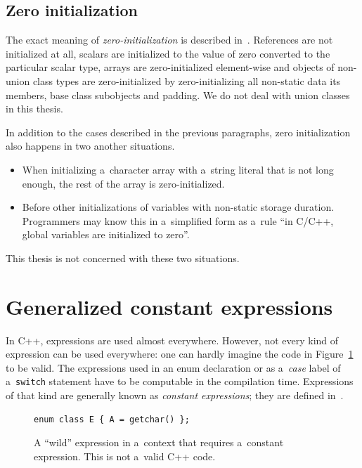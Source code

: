 \documentclass[nolot,nolof,nocover,printed]{fithesis3}
\newcommand{\stdN}[2]{\cite[#2]{#1}\xspace}
\begin{document}
\subsection{Zero initialization}
The exact meaning of \textit{zero-initialization} is described in~\stdN{n4296}{\S 8.5/6}. References are not initialized at all, scalars are initialized to the value of zero converted to the particular scalar type, arrays are zero-initialized element-wise and objects of non-union class types are zero-initialized by zero-initializing all non-static data its members, base class subobjects and padding. We do not deal with union classes in this thesis.

In addition to the cases described in the previous paragraphs, zero initialization also happens in two another situations.
\begin{itemize}
\item When initializing a~character array with a~string literal that is not long enough, the rest of the array is zero-initialized.
\item Before other initializations of variables with non-static storage duration. Programmers may know this in a~simplified form as a~rule \enquote{in C/C++, global variables are initialized to zero}.
\end{itemize}
This thesis is not concerned with these two situations.

\section{Generalized constant expressions}

In C++, expressions are used almost everywhere. However, not every kind of expression can be used everywhere: one can hardly imagine the code in Figure~\ref{fig:getcharInEnum} to be valid. The expressions used in an enum declaration or as a~\textit{case} label of a~\lstinline|switch| statement have to be computable in the compilation time. Expressions of that kind are generally known as \textit{constant expressions}; they are defined in~\stdN{n4296}{\S 5.20}.

\begin{figure}
\begin{lstlisting}
enum class E { A = getchar() };
\end{lstlisting}
\caption{A \enquote{wild} expression in a~context that requires a~constant expression. This is not a~valid C++ code.}
\label{fig:getcharInEnum}
\end{figure}
\end{document}

